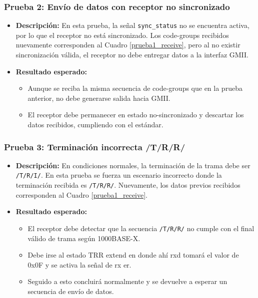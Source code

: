 
\subsubsection*{Prueba 2: Envío de datos con receptor no sincronizado}

\begin{itemize}
  \item \textbf{Descripción:}  
    En esta prueba, la señal \texttt{sync\_status} no se encuentra activa, por lo que el receptor no está sincronizado.  
    Los code-groups recibidos nuevamente corresponden al Cuadro \ref{prueba1_receive}, pero al no existir sincronización válida, el receptor no debe entregar datos a la interfaz GMII.

  \item \textbf{Resultado esperado:}
    \begin{itemize}
      \item Aunque se reciba la misma secuencia de code-groups que en la prueba anterior, no debe generarse salida hacia GMII.
      \item El receptor debe permanecer en estado no-sincronizado y descartar los datos recibidos, cumpliendo con el estándar.
    \end{itemize}
\end{itemize}


\subsubsection*{Prueba 3: Terminación incorrecta /T/R/R/}

\begin{itemize}
  \item \textbf{Descripción:}  
    En condiciones normales, la terminación de la trama debe ser \texttt{/T/R/I/}.  
    En esta prueba se fuerza un escenario incorrecto donde la terminación recibida es \texttt{/T/R/R/}.  
    Nuevamente, los datos previos recibidos corresponden al Cuadro \ref{prueba1_receive}.

  \item \textbf{Resultado esperado:}
    \begin{itemize}
      \item El receptor debe detectar que la secuencia \texttt{/T/R/R/} no cumple con el final válido de trama según 1000BASE-X.
      \item Debe irse al estado TRR extend en donde ahí rxd tomará el valor de 0x0F y se activa la señal de rx er.
      \item Seguido a esto concluirá normalmente y se devuelve a esperar un secuencia de envío de datos.
    \end{itemize}
\end{itemize}

